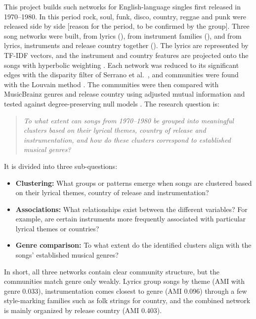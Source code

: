 This project builds such networks for English-language singles first released in 1970--1980. In this period rock, soul, funk, disco, country, reggae and punk were released side by side [reason for the period, to be confirmed by the group]. Three song networks were built, from lyrics (\Glyr), from instrument families (\Ginst), and from lyrics, instruments and release country together (\Gcomb). The lyrics are represented by TF-IDF vectors, and the instrument and country features are projected onto the songs with hyperbolic weighting \cite{TODO_newman2001hyperbolic}. Each network was reduced to its significant edges with the disparity filter of Serrano et al.\ \cite{TODO_serrano2009disparity}, and communities were found with the Louvain method \cite{TODO_blondel2008louvain}. The communities were then compared with MusicBrainz genres and release country using adjusted mutual information \cite{TODO_vinh2010ami} and tested against degree-preserving null models \cite{TODO_maslov2002rewiring}. The research question is:

\begin{quote}
\emph{To what extent can songs from 1970--1980 be grouped into meaningful clusters based on their lyrical themes, country of release and instrumentation, and how do these clusters correspond to established musical genres?}
\end{quote}

It is divided into three sub-questions:
\begin{itemize}
  \item \textbf{Clustering:} What groups or patterns emerge when songs are clustered based on their lyrical themes, country of release and instrumentation?
  \item \textbf{Associations:} What relationships exist between the different variables? For example, are certain instruments more frequently associated with particular lyrical themes or countries?
  \item \textbf{Genre comparison:} To what extent do the identified clusters align with the songs' established musical genres?
\end{itemize}

In short, all three networks contain clear community structure, but the communities match genre only weakly. Lyrics group songs by theme (AMI with genre 0.033), instrumentation comes closest to genre (AMI 0.096) through a few style-marking families such as folk strings for country, and the combined network is mainly organized by release country (AMI 0.403).

